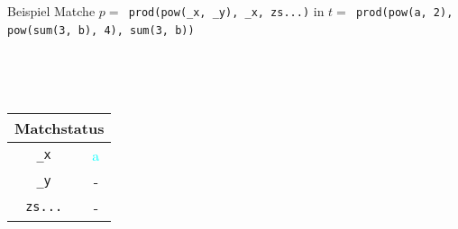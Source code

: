 \begin{frame}{Beispiel}
	Matche $p =$\verb~ prod(pow(_x, _y), _x, zs...)~ in 
	$t =$\verb~ prod(pow(a, 2), pow(sum(3, b), 4), sum(3, b))~
	~\\
	\begin{columns}[c] %
		\scriptsize
        \begin{column}{0.3\textwidth}	
			~\\~\\
			\begin{tabular} {c|c}
			\multicolumn{2}{c}{Matchstatus}\\
			\hline
			\verb~_x~      & \textcolor{cyan}{a}            \\
			\verb~_y~      & -            \\
			\verb~zs...~   & -            
			\end{tabular}
        \end{column}
		
        \begin{column}{0.3\textwidth}	
        \end{column}
	\end{columns}
\end{frame}

